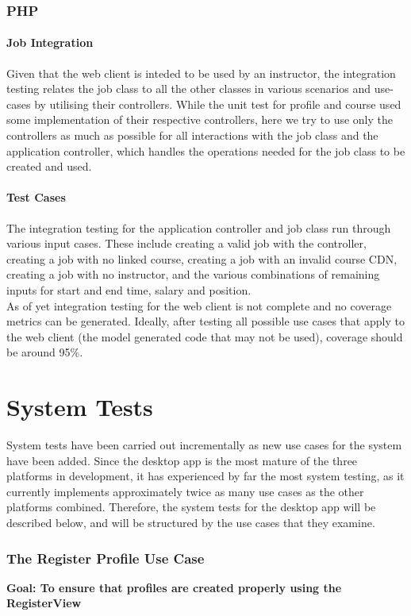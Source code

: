 \documentclass[12pt]{report}
\begin{document}
\section{PHP}
\subsection{Job Integration}
	Given that the web client is inteded to be used by an instructor, the integration testing relates the job class to all the other classes in various scenarios and use-cases by utilising their controllers. While the unit test for profile and course used some implementation of their respective controllers, here we try to use only the controllers as much as possible for all interactions with the job class and the application controller, which handles the operations needed for the job class to be created and used.

\subsection{Test Cases}
	The integration testing for the application controller and job class run through various input cases. These include creating a valid job with the controller, creating a job with no linked course, creating a job with an invalid course CDN, creating a job with no instructor, and the various combinations of remaining inputs for start and end time, salary and position.\\

	As of yet integration testing for the web client is not complete and no coverage metrics can be generated. Ideally, after testing all possible use cases that apply to the web client (the model generated code that may not be used), coverage should be around 95\%.\\
\part{System Tests}
System tests have been carried out incrementally as new use cases for the system have been added.
Since the desktop app is the most mature of the three platforms in development, it has experienced
by far the most system testing, as it currently implements approximately twice as many use cases as
the other platforms combined. Therefore, the system tests for the desktop app will be described
below, and will be structured by the use cases that they examine.

\section{The Register Profile Use Case}
\label{s:six}
\textbf{Goal: To ensure that profiles are created properly using the RegisterView}
\end{document}
